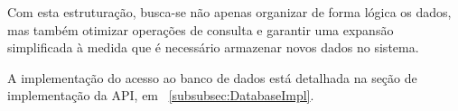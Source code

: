 Com esta estruturação, busca-se não apenas organizar de forma lógica os dados, mas também otimizar operações de consulta e garantir uma expansão simplificada à medida que é necessário armazenar novos dados no sistema.

A implementação do acesso ao banco de dados está detalhada na seção de implementação da API, em ~\ref{subsubsec:DatabaseImpl}.


